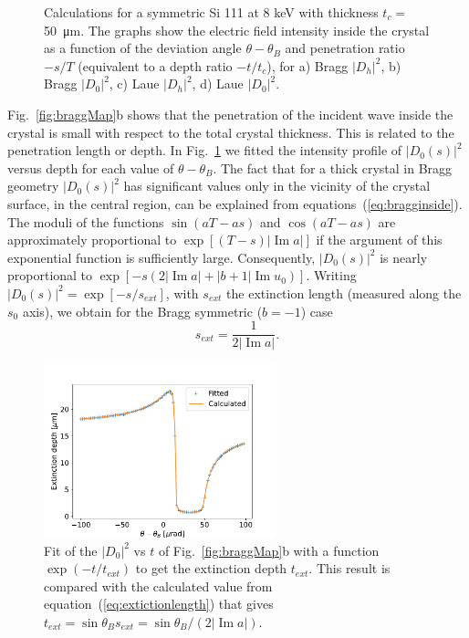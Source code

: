 \documentclass[preprint]{iucr}              %
\begin{document}
\begin{figure}
    \caption{Calculations for a symmetric Si 111 at 8 keV with thickness $t_c=$\SI{50}{\micro\meter}. The graphs show the electric field intensity inside the crystal as a function of the 
    deviation angle $\theta-\theta_B$ and penetration ratio $-s/T$ (equivalent to a depth ratio $-t/t_c$), for
    a) Bragg $|D_h|^2$, b) Bragg $|D_0|^2$,
    c) Laue $|D_h|^2$, d) Laue $|D_0|^2$.
    }
\end{figure}

Fig.~\ref{fig:braggMap}b shows that the penetration of the incident wave inside the crystal is small with respect to the total crystal thickness. This is related to the penetration length or depth. In Fig.~\ref{fig:penetration} we fitted the intensity profile of $|D_0(s)|^2$ versus depth for each value of $\theta-\theta_B$.
The fact that for a thick crystal in Bragg geometry $|D_0(s)|^2$ has significant values only in the vicinity of the crystal surface, in the central region, can be explained from equations~(\ref{eq:bragginside}). The moduli of the functions $\sin(aT-as)$ and $\cos(aT-as)$ are approximately proportional to $\exp[(T-s)|\operatorname{Im}a|]$ if the argument of this exponential function is sufficiently large. Consequently, $|D_0(s)|^2$ is nearly proportional to $\exp[-s(2|\operatorname{Im}a|+|b+1|\operatorname{Im}u_0)]$. Writing $|D_0(s)|^2=\exp[-s/s_{ext}]$, with $s_{ext}$ the extinction length (measured along the $s_0$ axis), we obtain for the Bragg symmetric ($b=-1$) case  
\begin{equation}\label{eq:extictionlength}
    s_{ext} = \frac{1}{2 |\operatorname{Im}a|}.
\end{equation}

\begin{figure}\label{fig:penetration}
    \centering
    \includegraphics[width=0.6\textwidth]{figures/penetration.pdf}

    \caption{Fit of the $|D_0|^2$ vs $t$ of Fig.~\ref{fig:braggMap}b with a function $\exp(-t/t_{ext})$ to get the extinction depth $t_{ext}$. This result is compared with the calculated value from equation~(\ref{eq:extictionlength}) that gives $t_{ext}=\sin\theta_B s_{ext} = \sin\theta_B/(2 |\operatorname{Im} a|)$.
    }
\end{figure}
\end{document}
